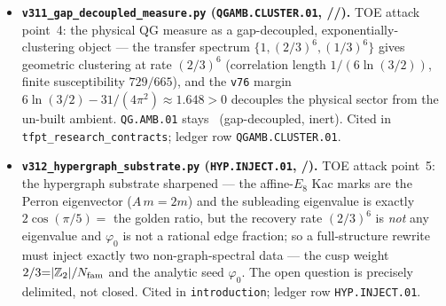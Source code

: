 \begin{itemize}
  pins the RG. Closes the spectrum/anomaly/$\beta$ sub-question; the interacting Epstein--Glaser $S$-matrix and the
  Yukawa sector stay \mC/\mO. Cited in \texttt{tfpt\_research\_contracts}; ledger row \texttt{CAR.SM.ANOM.01}.
\item \textbf{\texttt{v311\_gap\_decoupled\_measure.py} (\texttt{QGAMB.CLUSTER.01}, \mE/\mC/\mO).} TOE attack point~4:
  the physical QG measure as a gap-decoupled, exponentially-clustering object --- the transfer spectrum
  $\{1,(2/3)^6,(1/3)^6\}$ gives geometric clustering at rate $(2/3)^6$ (correlation length $1/(6\ln(3/2))$, finite
  susceptibility $729/665$), and the \texttt{v76} margin $6\ln(3/2)-31/(4\pi^2){\approx}1.648{>}0$ decouples the
  physical sector from the un-built ambient. \texttt{QG.AMB.01} stays \mO\ (gap-decoupled, inert). Cited in
  \texttt{tfpt\_research\_contracts}; ledger row \texttt{QGAMB.CLUSTER.01}.
\item \textbf{\texttt{v312\_hypergraph\_substrate.py} (\texttt{HYP.INJECT.01}, \mE/\mO).} TOE attack point~5: the
  hypergraph substrate sharpened --- the affine-$E_8$ Kac marks are the Perron eigenvector ($A\,m{=}2m$) and the
  subleading eigenvalue is exactly $2\cos(\pi/5)=$ the golden ratio, but the recovery rate $(2/3)^6$ is \emph{not}
  any eigenvalue and $\varphi_0$ is not a rational edge fraction; so a full-structure rewrite must inject exactly two
  non-graph-spectral data --- the cusp weight $2/3{=}|\mathbb Z_2|/N_{\mathrm{fam}}$ and the analytic seed $\varphi_0$. The open
  question is precisely delimited, not closed. Cited in \texttt{introduction}; ledger row \texttt{HYP.INJECT.01}.
\end{itemize}

